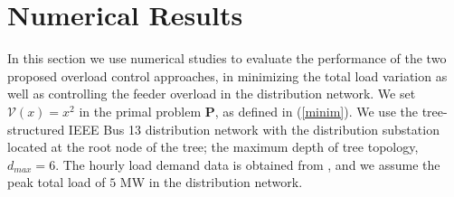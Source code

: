\documentclass[12pt,draftcls,onecolumn]{IEEEtran}
\begin{document}
\section{Numerical Results}\label{sec:sim}
\indent In this section we use numerical studies to evaluate the performance of the two proposed overload control approaches, in minimizing the total load variation as well as controlling the feeder overload in the distribution network. We set $\mathcal{V}(x)=x^2$ in the primal problem $\mathbf{P}$, as defined in (\ref{minim}). We use the tree-structured IEEE Bus 13 distribution network \cite{B13} with the distribution substation located at the root node of the tree; the maximum depth of tree topology, $d_{max}=6$. The hourly load demand data is obtained from \cite{AE10}, and we assume the peak total load of $5$ MW in the distribution network.
\end{document}
